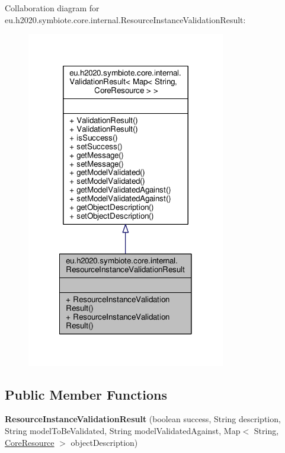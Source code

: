 Collaboration diagram for eu.\+h2020.\+symbiote.\+core.\+internal.\+Resource\+Instance\+Validation\+Result\+:
\nopagebreak
\begin{figure}[H]
\begin{center}
\leavevmode
\includegraphics[width=246pt]{classeu_1_1h2020_1_1symbiote_1_1core_1_1internal_1_1ResourceInstanceValidationResult__coll__graph}
\end{center}
\end{figure}
\subsection*{Public Member Functions}
\begin{DoxyCompactItemize}
\item 
\mbox{\label{classeu_1_1h2020_1_1symbiote_1_1core_1_1internal_1_1ResourceInstanceValidationResult_a1de4c427fcc1bb7ac2203fd44ccfe7c2}} 
{\bfseries Resource\+Instance\+Validation\+Result} (boolean success, String description, String model\+To\+Be\+Validated, String model\+Validated\+Against, Map$<$ String, \hyperlink{classeu_1_1h2020_1_1symbiote_1_1core_1_1internal_1_1CoreResource}{Core\+Resource} $>$ object\+Description)
\end{DoxyCompactItemize}


